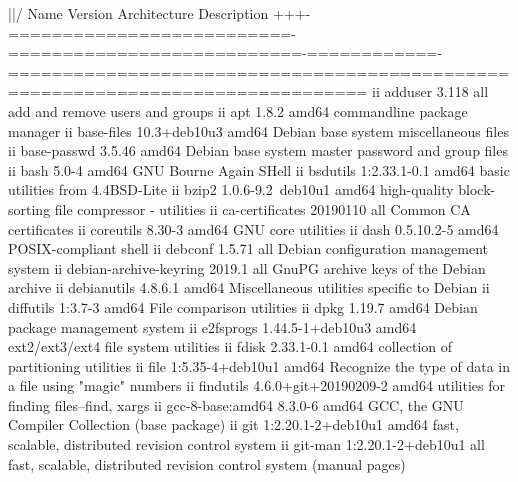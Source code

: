 ||/ Name                       Version                     Architecture Description
+++-==========================-===========================-============-===============================================================================
ii  adduser                    3.118                       all          add and remove users and groups
ii  apt                        1.8.2                       amd64        commandline package manager
ii  base-files                 10.3+deb10u3                amd64        Debian base system miscellaneous files
ii  base-passwd                3.5.46                      amd64        Debian base system master password and group files
ii  bash                       5.0-4                       amd64        GNU Bourne Again SHell
ii  bsdutils                   1:2.33.1-0.1                amd64        basic utilities from 4.4BSD-Lite
ii  bzip2                      1.0.6-9.2~deb10u1           amd64        high-quality block-sorting file compressor - utilities
ii  ca-certificates            20190110                    all          Common CA certificates
ii  coreutils                  8.30-3                      amd64        GNU core utilities
ii  dash                       0.5.10.2-5                  amd64        POSIX-compliant shell
ii  debconf                    1.5.71                      all          Debian configuration management system
ii  debian-archive-keyring     2019.1                      all          GnuPG archive keys of the Debian archive
ii  debianutils                4.8.6.1                     amd64        Miscellaneous utilities specific to Debian
ii  diffutils                  1:3.7-3                     amd64        File comparison utilities
ii  dpkg                       1.19.7                      amd64        Debian package management system
ii  e2fsprogs                  1.44.5-1+deb10u3            amd64        ext2/ext3/ext4 file system utilities
ii  fdisk                      2.33.1-0.1                  amd64        collection of partitioning utilities
ii  file                       1:5.35-4+deb10u1            amd64        Recognize the type of data in a file using "magic" numbers
ii  findutils                  4.6.0+git+20190209-2        amd64        utilities for finding files--find, xargs
ii  gcc-8-base:amd64           8.3.0-6                     amd64        GCC, the GNU Compiler Collection (base package)
ii  git                        1:2.20.1-2+deb10u1          amd64        fast, scalable, distributed revision control system
ii  git-man                    1:2.20.1-2+deb10u1          all          fast, scalable, distributed revision control system (manual pages)
